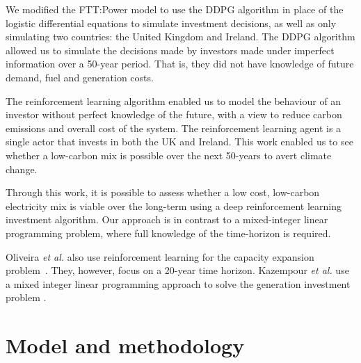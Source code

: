 \documentclass{article}
\begin{document}
We modified the FTT:Power model to use the DDPG algorithm in place of the logistic differential equations to simulate investment decisions, as well as only simulating two countries: the United Kingdom and Ireland. The DDPG algorithm allowed us to simulate the decisions made by investors made under imperfect information over a 50-year period. That is, they did not have knowledge of future demand, fuel and generation costs. 

The reinforcement learning algorithm enabled us to model the behaviour of an investor without perfect knowledge of the future, with a view to reduce carbon emissions and overall cost of the system. The reinforcement learning agent is a single actor that invests in both the UK and Ireland. This work enabled us to see whether a low-carbon mix is possible over the next 50-years to avert climate change.

Through this work, it is possible to assess whether a low cost, low-carbon electricity mix is viable over the long-term using a deep reinforcement learning investment algorithm. Our approach is in contrast to a mixed-integer linear programming problem, where full knowledge of the time-horizon is required.

Oliveira \textit{et al.} also use reinforcement learning for the capacity expansion problem~\cite{Oliveira2018}. They, however, focus on a 20-year time horizon. Kazempour \textit{et al.} use a mixed integer linear programming approach to solve the generation investment problem \cite{Kazempour2011}.






\section{Model and methodology}
\label{sec:methods}
\end{document}
